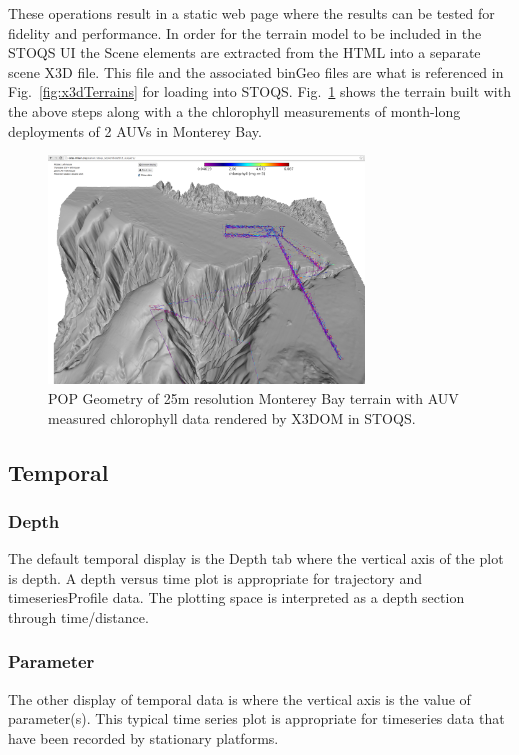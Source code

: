 \documentclass[conference]{IEEEtran}
\begin{document}
These operations result in a static web page where the results can be tested for fidelity and performance. In order for the terrain model to be included in the STOQS UI the Scene elements are extracted from the HTML into a separate scene X3D file. This file and the associated binGeo files are what is referenced in Fig.~\ref{fig:x3dTerrains} for loading into STOQS. Fig.~\ref{fig:Monterey25_lrauvs} shows the terrain built with the above steps along with a the chlorophyll measurements of month-long deployments of 2 AUVs in Monterey Bay.

\begin{figure}[htbp]
\centering
\includegraphics[width=3.3in]{Monterey25_lrauvs.png}
\caption{POP Geometry of 25m resolution Monterey Bay terrain with AUV measured chlorophyll data rendered by X3DOM in STOQS.}
\label{fig:Monterey25_lrauvs}
\end{figure}


\subsection{Temporal}

\subsubsection{Depth}
The default temporal display is the Depth tab where the vertical axis of the plot is depth. A depth versus time plot is appropriate for trajectory and timeseriesProfile data. The plotting space is interpreted as a depth section through time/distance. 

\subsubsection{Parameter}
The other display of temporal data is where the vertical axis is the value of parameter(s). This typical time series plot is appropriate for timeseries data that have been recorded by stationary platforms. 
\end{document}

